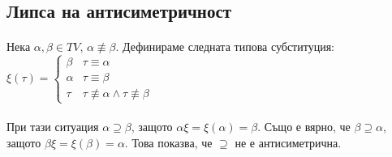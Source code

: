 \documentclass[12pt]{article}
\begin{document}
\subsection*{Липса на антисиметричност}
\paragraph*{}
Нека $\alpha, \beta \in TV$, $\alpha \not\equiv \beta$. Дефинираме следната типова субституция:
$
\xi(\tau) = 
 \begin{cases} 
    \beta & \tau \equiv \alpha \\
    \alpha & \tau \equiv \beta \\
    \tau & \tau \not\equiv \alpha \land \tau \not\equiv \beta
 \end{cases}
$
\paragraph*{}
При тази ситуация $\alpha \supseteq \beta$, защото $\alpha \xi = \xi(\alpha) = \beta$. Също е вярно, че $\beta \supseteq \alpha$, защото $\beta \xi = \xi(\beta) = \alpha$. Това показва, че $\supseteq$ не е антисиметрична.
\end{document}
